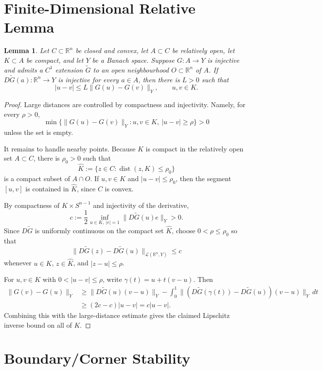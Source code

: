 \documentclass[11pt]{article}
\newtheorem{lemma}{Lemma}
\newcommand{\R}{\mathbb R}
\newcommand{\dist}{\operatorname{dist}}
\begin{document}
\section{Finite-Dimensional Relative Lemma}

\begin{lemma}\label{lem:relative}
Let \(C\subset\R^n\) be closed and convex, let \(A\subset C\) be relatively open, let \(K\subset A\) be compact, and let \(Y\) be a Banach space.  Suppose \(G:A\to Y\) is injective and admits a \(C^1\) extension \(\widetilde G\) to an open neighbourhood \(O\subset\R^n\) of \(A\).  If \(D\widetilde G(a):\R^n\to Y\) is injective for every \(a\in A\), then there is \(L>0\) such that
\[
  |u-v|\le L\|G(u)-G(v)\|_Y,\qquad u,v\in K.
\]
\end{lemma}

\begin{proof}
Large distances are controlled by compactness and injectivity.  Namely, for every \(\rho>0\),
\[
  \min\{\|G(u)-G(v)\|_Y:u,v\in K,\ |u-v|\ge\rho\}>0
\]
unless the set is empty.

It remains to handle nearby points.  Because \(K\) is compact in the relatively open set \(A\subset C\), there is \(\rho_0>0\) such that
\[
  \widehat K:=\{z\in C:\dist(z,K)\le \rho_0\}
\]
is a compact subset of \(A\cap O\).  If \(u,v\in K\) and \(|u-v|\le\rho_0\), then the segment \([u,v]\) is contained in \(\widehat K\), since \(C\) is convex.

By compactness of \(K\times S^{n-1}\) and injectivity of the derivative,
\[
  c:=\frac12\inf_{u\in K,\ |e|=1}\|D\widetilde G(u)e\|_Y>0.
\]
Since \(D\widetilde G\) is uniformly continuous on the compact set \(\widehat K\), choose \(0<\rho\le\rho_0\) so that
\[
  \|D\widetilde G(z)-D\widetilde G(u)\|_{\mathcal L(\R^n,Y)}\le c
\]
whenever \(u\in K\), \(z\in\widehat K\), and \(|z-u|\le\rho\).

For \(u,v\in K\) with \(0<|u-v|\le\rho\), write \(\gamma(t)=u+t(v-u)\).  Then
\[
\begin{aligned}
  \|G(v)-G(u)\|_Y
  &\ge \|D\widetilde G(u)(v-u)\|_Y
     -\int_0^1\|(D\widetilde G(\gamma(t))-D\widetilde G(u))(v-u)\|_Y\,dt  \\
  &\ge (2c-c)|u-v|=c|u-v|.
\end{aligned}
\]
Combining this with the large-distance estimate gives the claimed Lipschitz inverse bound on all of \(K\).
\end{proof}

\section{Boundary/Corner Stability}
\end{document}
